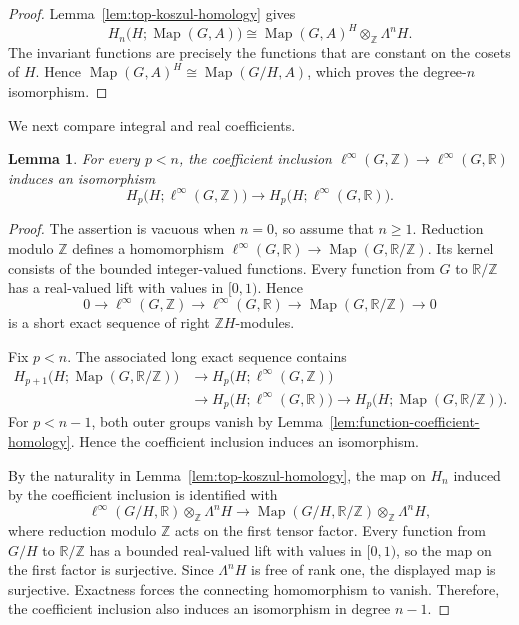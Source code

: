 \documentclass[pdflatex,sn-mathphys-num]{sn-jnl}%
\theoremstyle{plain}
\newtheorem{lemma}[theorem]{Lemma}
\theoremstyle{remark}
\theoremstyle{definition}
\numberwithin{equation}{section}
\begin{document}
\begin{proof}
Lemma~\ref{lem:top-koszul-homology} gives
\[
H_n\bigl(H;\operatorname{Map}(G,A)\bigr)
\cong
\operatorname{Map}(G,A)^H
\otimes_{\mathbb Z}
\Lambda^nH.
\]
The invariant functions are precisely the functions that are constant on the cosets of \( H \). Hence \( \operatorname{Map}(G,A)^H\cong\operatorname{Map}(G/H,A) \), which proves the degree-\( n \) isomorphism.
\end{proof}

We next compare integral and real coefficients.

\begin{lemma}
\label{lem:integral-real-homology-comparison}
For every \( p<n \), the coefficient inclusion \( \ell^\infty(G,\mathbb Z)\to\ell^\infty(G,\mathbb R) \) induces an isomorphism
\[
H_p\bigl(H;\ell^\infty(G,\mathbb Z)\bigr)
\longrightarrow
H_p\bigl(H;\ell^\infty(G,\mathbb R)\bigr).
\]
\end{lemma}

\begin{proof}
The assertion is vacuous when \( n=0 \), so assume that \( n\geq1 \). Reduction modulo \( \mathbb Z \) defines a homomorphism \( \ell^\infty(G,\mathbb R)\to\operatorname{Map}(G,\mathbb R/\mathbb Z) \). Its kernel consists of the bounded integer-valued functions. Every function from \( G \) to \( \mathbb R/\mathbb Z \) has a real-valued lift with values in \( [0,1) \). Hence
\[
0
\longrightarrow
\ell^\infty(G,\mathbb Z)
\longrightarrow
\ell^\infty(G,\mathbb R)
\longrightarrow
\operatorname{Map}(G,\mathbb R/\mathbb Z)
\longrightarrow
0
\]
is a short exact sequence of right \( \mathbb ZH \)-modules.

Fix \( p<n \). The associated long exact sequence contains
\[
\begin{aligned}
H_{p+1}\bigl(H;\operatorname{Map}(G,\mathbb R/\mathbb Z)\bigr)
&\longrightarrow
H_p\bigl(H;\ell^\infty(G,\mathbb Z)\bigr)\\
&\longrightarrow
H_p\bigl(H;\ell^\infty(G,\mathbb R)\bigr)
\longrightarrow
H_p\bigl(H;\operatorname{Map}(G,\mathbb R/\mathbb Z)\bigr).
\end{aligned}
\]
For \( p<n-1 \), both outer groups vanish by Lemma~\ref{lem:function-coefficient-homology}. Hence the coefficient inclusion induces an isomorphism.

By the naturality in Lemma~\ref{lem:top-koszul-homology}, the map on \( H_n \) induced by the coefficient inclusion is identified with
\[
\ell^\infty(G/H,\mathbb R)
\otimes_{\mathbb Z}
\Lambda^nH
\longrightarrow
\operatorname{Map}(G/H,\mathbb R/\mathbb Z)
\otimes_{\mathbb Z}
\Lambda^nH,
\]
where reduction modulo \( \mathbb Z \) acts on the first tensor factor. Every function from \( G/H \) to \( \mathbb R/\mathbb Z \) has a bounded real-valued lift with values in \( [0,1) \), so the map on the first factor is surjective. Since \( \Lambda^nH \) is free of rank one, the displayed map is surjective. Exactness forces the connecting homomorphism to vanish. Therefore, the coefficient inclusion also induces an isomorphism in degree \( n-1 \).
\end{proof}
\end{document}
